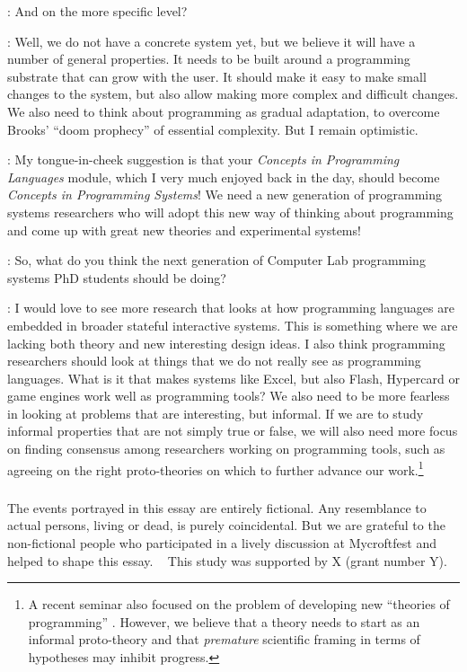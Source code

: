 \documentclass[runningheads]{llncs}
\newcommand{\T}{Tomas}
\newcommand{\J}{Joel}
\newcommand{\says}[2][gg]{\vspace{0.5em}\noindent\hangindent=0.5cm{\textsc{#1}}: #2}
\begin{document}
\says[Alan]{And on the more specific level?}

\says[\J]{Well, we do not have a concrete system yet, but we believe it will have a number of general properties. It needs to be built around a programming substrate that can grow with the user. It should make it easy to make small changes to the system, but also allow making more complex and difficult changes. We also need to think about programming as gradual adaptation, to overcome Brooks' ``doom prophecy'' of essential complexity. But I remain optimistic.}

\says[\T]{My tongue-in-cheek suggestion is that your
\emph{Concepts in Programming Languages} module, which I very much enjoyed back in the day, should become
\emph{Concepts in Programming Systems}! We need a new generation of programming systems researchers who will adopt this new way of thinking about programming and come up with great new theories and experimental systems!}

\says[Alan]{So, what do you think the next generation of Computer Lab programming systems PhD students should be doing?}

\says[\J]{I would love to see more research that looks at how programming languages are embedded in broader stateful interactive systems. This is something where we are lacking both theory and new interesting design ideas. I also think programming researchers should look at things that we do not really see as programming languages. What is it that makes systems like Excel, but also Flash, Hypercard or game engines work well as programming tools? We also need to be more fearless in looking at problems that are interesting, but informal. If we are to study informal properties that are not simply true or false, we will also need more focus on finding consensus among researchers working on programming tools, such as agreeing on the right proto-theories on which to further advance our work.\footnote{A recent seminar also focused on the problem of developing new ``theories of programming'' \cite{latoza-2023-theories}. However, we believe that a theory needs to start as an informal proto-theory and that \emph{premature} scientific framing in terms of hypotheses may inhibit progress.}}

\begin{credits}
\subsubsection{\ackname}
The events portrayed in this essay are entirely fictional. Any resemblance to actual persons, living or dead, is purely coincidental. But we are grateful to the non-fictional people who participated in a lively discussion at Mycroftfest and helped to shape this essay.
~
This study was supported by X (grant number Y).
\end{credits}



\end{document}
